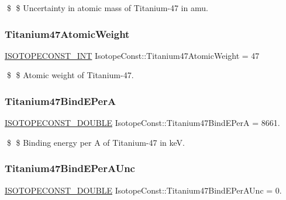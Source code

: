 \$ \$ Uncertainty in atomic mass of Titanium-\/47 in amu. \mbox{\label{group___isotope_const-_titanium-_ti47_ga9ce5b20f72bd38b91f9e597b7a16f6a1}} 
\subsubsection{\texorpdfstring{Titanium47\+Atomic\+Weight}{Titanium47AtomicWeight}}
{\footnotesize\ttfamily \mbox{\hyperlink{group___isotope_const-_macros_ga5f18360b3e99483a35c32d789e62621c}{I\+S\+O\+T\+O\+P\+E\+C\+O\+N\+S\+T\+\_\+\+I\+NT}} Isotope\+Const\+::\+Titanium47\+Atomic\+Weight = 47}

\$ \$ Atomic weight of Titanium-\/47. \mbox{\label{group___isotope_const-_titanium-_ti47_ga000bf42573dd654342bb30da95d0cc1c}} 
\subsubsection{\texorpdfstring{Titanium47\+Bind\+E\+PerA}{Titanium47BindEPerA}}
{\footnotesize\ttfamily \mbox{\hyperlink{group___isotope_const-_macros_ga8f45a7272ce02c0b4c65c44636ed719a}{I\+S\+O\+T\+O\+P\+E\+C\+O\+N\+S\+T\+\_\+\+D\+O\+U\+B\+LE}} Isotope\+Const\+::\+Titanium47\+Bind\+E\+PerA = 8661.}

\$ \$ Binding energy per A of Titanium-\/47 in keV. \mbox{\label{group___isotope_const-_titanium-_ti47_ga42241d63bfccbbf56d6bf328d08d91c0}} 
\subsubsection{\texorpdfstring{Titanium47\+Bind\+E\+Per\+A\+Unc}{Titanium47BindEPerAUnc}}
{\footnotesize\ttfamily \mbox{\hyperlink{group___isotope_const-_macros_ga8f45a7272ce02c0b4c65c44636ed719a}{I\+S\+O\+T\+O\+P\+E\+C\+O\+N\+S\+T\+\_\+\+D\+O\+U\+B\+LE}} Isotope\+Const\+::\+Titanium47\+Bind\+E\+Per\+A\+Unc = 0.}

